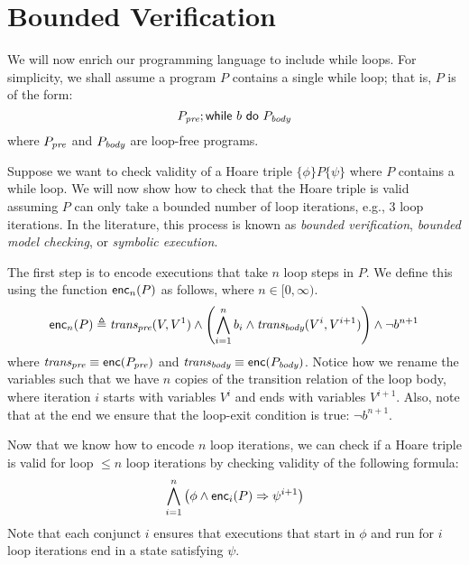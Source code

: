 \documentclass{amsart}
\theoremstyle{definition}
\theoremstyle{remark}
\numberwithin{equation}{section}
\begin{document}
\section{Bounded Verification}
We will now enrich our programming language to include while loops.
For simplicity, we shall assume  a program $P$ contains
a single while loop; that is, $P$ is of the form:
$$P_{\emph{pre}}; \mathsf{while}~ b ~\mathsf{do}~ P_{\emph{body}}$$
where $P_{\emph{pre}}$ and $P_{\emph{body}}$ are loop-free programs.

Suppose we want to check validity of a
Hoare triple $\{\phi\} P \{\psi\}$
where $P$ contains a while loop.
We will now show how to check that the Hoare triple
is valid assuming $P$ can only take a bounded number
of loop iterations, e.g., 3 loop iterations.
In the literature, this process is known as \emph{bounded verification},
\emph{bounded model checking}, or \emph{symbolic execution}.

The first step is to encode executions that take $n$
loop steps in $P$.
We define this using the function
$\mathsf{enc}_n(P)$ as follows, where $n \in [0,\infty)$.
%
\begin{align*}
\mathsf{enc}_n(P) \triangleq
\emph{trans}_{\emph{pre}}(V,V^1) \land
\left(\bigwedge_{i = 1}^{n}
b_i \land \emph{trans}_{\emph{body}}(V^i, V^{i+1})\right)
\land \neg b^{n+1}
\end{align*}
%
where $\emph{trans}_{\emph{pre}} \equiv \mathsf{enc}(P_{\emph{pre}})$
and $\emph{trans}_{\emph{body}} \equiv \mathsf{enc}(P_{\emph{body}})$.
Notice how we rename the variables such that
we have $n$ copies of the transition relation
of the loop body,
where iteration $i$ starts with variables $V^i$
and ends with variables $V^{i+1}$.
Also, note that at the end we ensure that the loop-exit condition is true: $\neg b^{n+1}$.

Now that we know how to encode $n$
loop iterations, we can check if a Hoare triple
is valid for loop  $\leq n$ loop iterations by
checking validity of the following formula:
\begin{align*}
  \bigwedge_{i=1}^n \left(\phi \land \mathsf{enc}_i(P) \Rightarrow \psi^{i+1}\right)
\end{align*}
Note that each conjunct $i$ ensures
that executions that start in $\phi$
and run for $i$ loop iterations end in a state satisfying
$\psi$.
\end{document}
